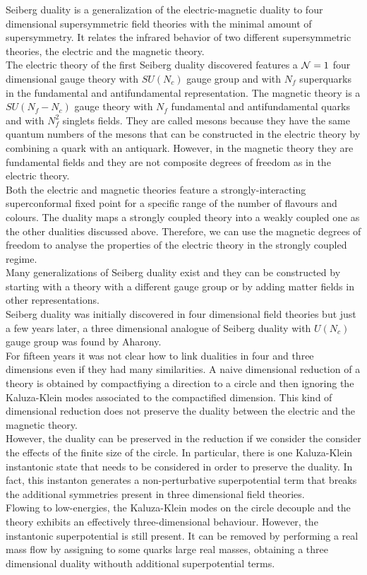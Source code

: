 Seiberg duality is a generalization of the electric-magnetic duality to four dimensional supersymmetric field theories with the minimal amount of supersymmetry.
It relates the infrared behavior of two different supersymmetric theories, the electric and the magnetic theory.\\
The electric theory of the first Seiberg duality discovered features a $\mathcal{N}=1$ four dimensional gauge theory with $SU(N_c)$ gauge group and with $N_f$ superquarks in the fundamental and antifundamental representation.
The magnetic theory is a $SU(N_f-N_c)$ gauge theory with $N_f$ fundamental and antifundamental quarks and with $N_f^2$ singlets fields. 
They are called mesons because they have the same quantum numbers of the mesons that can be constructed in the electric theory by combining a quark with an antiquark. 
However, in the magnetic theory they are fundamental fields and they are not composite degrees of freedom as in the electric theory.\\
Both the electric and magnetic theories feature a strongly-interacting superconformal fixed point for a specific range of the number of flavours and colours. 
The duality maps a strongly coupled theory into a weakly coupled one as the other dualities discussed above. 
Therefore, we can use the magnetic degrees of freedom to analyse the properties of the electric theory in the strongly coupled regime.\\
Many generalizations of Seiberg duality exist and they can be constructed by starting with a theory with a different gauge group or by adding matter fields in other representations.
\\
Seiberg duality was initially discovered in four dimensional field theories but just a few years later, a three dimensional analogue of Seiberg duality with $U(N_c)$ gauge group was found by Aharony.\\

For fifteen years it was not clear how to link dualities in four and three dimensions even if they had many similarities. 
A naive dimensional reduction of a theory is obtained by compactfiying a direction to a circle and then ignoring the Kaluza-Klein modes associated to the compactified dimension.
This kind of dimensional reduction does not preserve the duality between the electric and the magnetic theory.  \\
However, the duality can be preserved in the reduction if we consider the consider the effects of the finite size of the circle.
In particular, there is one Kaluza-Klein instantonic state that needs to be considered in order to preserve the duality.
In fact, this instanton generates a non-perturbative superpotential term that breaks the additional symmetries present in three dimensional field theories.\\
Flowing to low-energies, the Kaluza-Klein modes on the circle decouple and the theory exhibits an effectively three-dimensional behaviour.
However, the instantonic superpotential is still present. 
It can be removed by performing a real mass flow by assigning to some quarks large real masses, obtaining a three dimensional duality withouth additional superpotential terms.

